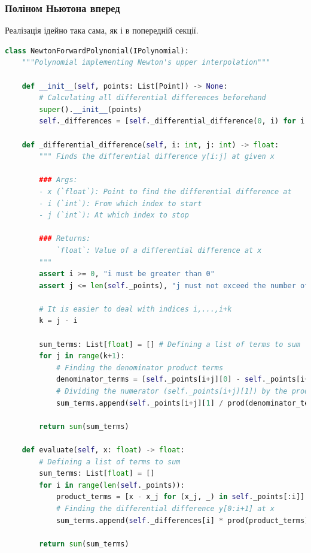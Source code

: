 \documentclass[12pt]{extarticle}
\begin{document}
\subsubsection{Поліном Ньютона вперед}

Реалізація ідейно така сама, як і в попередній секції.

\begin{lstlisting}[language=Python, caption=Реалізація полінома Ньютона вперед]
class NewtonForwardPolynomial(IPolynomial):
    """Polynomial implementing Newton's upper interpolation"""
    
    def __init__(self, points: List[Point]) -> None:
        # Calculating all differential differences beforehand
        super().__init__(points)
        self._differences = [self._differential_difference(0, i) for i in range(len(points))]
        
    def _differential_difference(self, i: int, j: int) -> float:
        """ Finds the differential difference y[i:j] at given x

        ### Args:
        - x (`float`): Point to find the differential difference at
        - i (`int`): From which index to start
        - j (`int`): At which index to stop

        ### Returns:
            `float`: Value of a differential difference at x
        """
        assert i >= 0, "i must be greater than 0"
        assert j <= len(self._points), "j must not exceed the number of points"
        
        # It is easier to deal with indices i,...,i+k
        k = j - i
        
        sum_terms: List[float] = [] # Defining a list of terms to sum
        for j in range(k+1):
            # Finding the denominator product terms
            denominator_terms = [self._points[i+j][0] - self._points[i+l][0] for l in range(k+1) if l!=j]
            # Dividing the numerator (self._points[i+j][1]) by the product of denominator terms
            sum_terms.append(self._points[i+j][1] / prod(denominator_terms))
        
        return sum(sum_terms)
    
    def evaluate(self, x: float) -> float:
        # Defining a list of terms to sum
        sum_terms: List[float] = []
        for i in range(len(self._points)):
            product_terms = [x - x_j for (x_j, _) in self._points[:i]]
            # Finding the differential difference y[0:i+1] at x
            sum_terms.append(self._differences[i] * prod(product_terms))
        
        return sum(sum_terms)
\end{lstlisting}
\end{document}
